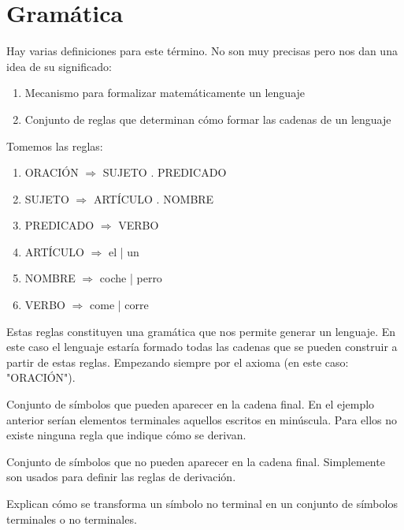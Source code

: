 \documentclass{apuntes}
\begin{document}
\chapter{Gramática}
\begin{defn}[Gramática]
Hay varias definiciones para este término. No son muy precisas pero nos dan una idea de su significado:
\begin{enumerate}
\item Mecanismo para formalizar matemáticamente un lenguaje
\item Conjunto de reglas que determinan cómo formar las cadenas de un lenguaje
\end{enumerate}
\end{defn}

\begin{example}
Tomemos las reglas:
\begin{enumerate}
\item ORACIÓN $\Rightarrow$ SUJETO . PREDICADO
\item SUJETO $\Rightarrow$ ARTÍCULO . NOMBRE
\item PREDICADO $\Rightarrow$ VERBO
\item ARTÍCULO $\Rightarrow$ el | un
\item NOMBRE $\Rightarrow$ coche | perro
\item VERBO $\Rightarrow$ come | corre
\end{enumerate}
Estas reglas constituyen una gramática que nos permite generar un lenguaje. En este caso el lenguaje estaría formado todas las cadenas que se pueden construir a partir de estas reglas. Empezando siempre por el axioma (en este caso: "ORACIÓN").
\end{example}

\begin{defn}
Conjunto de símbolos que pueden aparecer en la cadena final. En el ejemplo anterior serían elementos terminales aquellos escritos en minúscula. Para ellos no existe ninguna regla que indique cómo se derivan.
\end{defn}

\begin{defn}
Conjunto de símbolos que no pueden aparecer en la cadena final. Simplemente son usados para definir las reglas de derivación.
\end{defn}

\begin{defn}
Explican cómo se transforma un símbolo no terminal en un conjunto de símbolos terminales o no terminales.
\end{defn}
\end{document}
